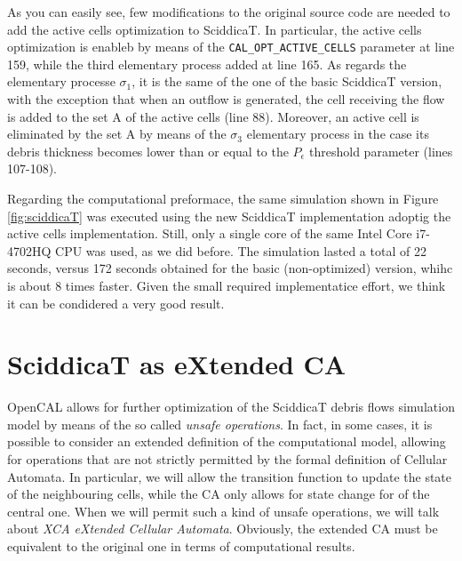 
  




As you can easily see, few modifications to the original source code
are needed to add the active cells optimization to SciddicaT. In
particular, the active cells optimization is enableb by means of the
\verb'CAL_OPT_ACTIVE_CELLS' parameter at line 159, while the third
elementary process added at line 165. As regards the elementary
processe $\sigma_1$, it is the same of the one of the basic SciddicaT
version, with the exception that when an outflow is generated, the
cell receiving the flow is added to the set A of the active cells
(line 88). Moreover, an active cell is eliminated by the set A by
means of the $\sigma_3$ elementary process in the case its debris
thickness becomes lower than or equal to the $P_\epsilon$ threshold
parameter (lines 107-108).

Regarding the computational preformace, the same simulation shown in
Figure \ref{fig:sciddicaT} was executed using the new SciddicaT
implementation adoptig the active cells implementation. Still, only a
single core of the same Intel Core i7-4702HQ CPU was used, as we did
before. The simulation lasted a total of 22 seconds, versus 172
seconds obtained for the basic (non-optimized) version, whihc is about
8 times faster. Given the small required implementatice effort, we
think it can be condidered a very good result.

\section{SciddicaT as eXtended CA}
OpenCAL allows for further optimization of the SciddicaT debris flows
simulation model by means of the so called \emph{unsafe
  operations}. In fact, in some cases, it is possible to consider an
extended definition of the computational model, allowing for
operations that are not strictly permitted by the formal definition of
Cellular Automata. In particular, we will allow the transition
function to update the state of the neighbouring cells, while the CA
only allows for state change for of the central one. When we will
permit such a kind of unsafe operations, we will talk about \emph{XCA
  eXtended Cellular Automata}. Obviously, the extended CA must be
equivalent to the original one in terms of computational results.

